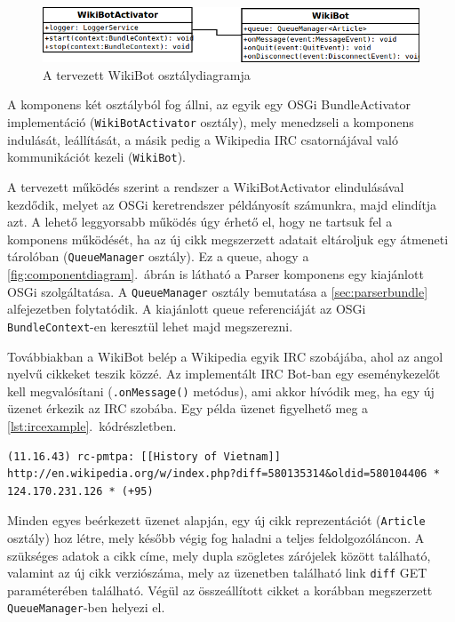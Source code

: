 \begin{figure}[htp]
\centering
\includegraphics[scale=0.45]{img/class_wikiBot}
\caption{A tervezett WikiBot osztálydiagramja}
\label{fig:class_wikiBot}
\end{figure}

A komponens két osztályból fog állni, az egyik egy OSGi BundleActivator implementáció (\texttt{WikiBotActivator} osztály), mely menedzseli a komponens indulását, leállítását, a másik pedig a Wikipedia IRC csatornájával való kommunikációt kezeli (\texttt{WikiBot}).

A tervezett működés szerint a rendszer a WikiBotActivator elindulásával kezdődik, melyet az OSGi keretrendszer példányosít számunkra, majd elindítja azt. A lehető leggyorsabb működés úgy érhető el, hogy ne tartsuk fel a komponens működését, ha az új cikk megszerzett adatait eltároljuk egy átmeneti tárolóban (\texttt{QueueManager} osztály). Ez a queue, ahogy a \ref{fig:componentdiagram}.~ábrán is látható a Parser komponens egy kiajánlott OSGi szolgáltatása. A \texttt{QueueManager} osztály bemutatása a \ref{sec:parserbundle} alfejezetben folytatódik. A kiajánlott queue referenciáját az OSGi \texttt{BundleContext}-en keresztül lehet majd megszerezni.

Továbbiakban a WikiBot belép a Wikipedia egyik IRC szobájába, ahol az angol nyelvű cikkeket teszik közzé. Az implementált IRC Bot-ban egy eseménykezelőt kell megvalósítani (\texttt{.onMessage()} metódus), ami akkor hívódik meg, ha egy új üzenet érkezik az IRC szobába. Egy példa üzenet figyelhető meg a \ref{lst:ircexample}.~kódrészletben.

\begin{lstlisting}[label={lst:ircexample}, caption=Példa üzenet az angol nyelvű Wikipedia IRC csatornájából,breaklines=true]
(11.16.43) rc-pmtpa: [[History of Vietnam]]  http://en.wikipedia.org/w/index.php?diff=580135314&oldid=580104406 * 124.170.231.126 * (+95) 
\end{lstlisting}

Minden egyes beérkezett üzenet alapján, egy új cikk reprezentációt (\texttt{Article} osztály) hoz létre, mely később végig fog haladni a teljes feldolgozóláncon. A szükséges adatok a cikk címe, mely dupla szögletes zárójelek között található, valamint az új cikk verziószáma, mely az üzenetben található link \texttt{diff} GET paraméterében található. Végül az összeállított cikket a korábban megszerzett \texttt{QueueManager}-ben helyezi el.

